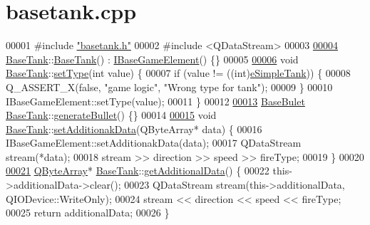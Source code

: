 \hypertarget{a00038_source}{}\section{basetank.\+cpp}
\label{a00038_source}

\begin{DoxyCode}
00001 \textcolor{preprocessor}{#}\textcolor{preprocessor}{include} \hyperlink{a00041}{"basetank.h"}
00002 \textcolor{preprocessor}{#}\textcolor{preprocessor}{include} \textcolor{preprocessor}{<}\textcolor{preprocessor}{QDataStream}\textcolor{preprocessor}{>}
00003 
\hyperlink{a00157_ab09f29abaec12417480cae3a5f900a41}{00004} \hyperlink{a00157}{BaseTank}::\hyperlink{a00157_ab09f29abaec12417480cae3a5f900a41}{BaseTank}() : \hyperlink{a00137_ae2be75da1a2a9edfabe993770e24654a}{IBaseGameElement}() \{\}
00005 
\hyperlink{a00157_a455ad8853248e1976e9d817eb55f102a}{00006} \textcolor{keywordtype}{void} \hyperlink{a00157}{BaseTank}::\hyperlink{a00157_a455ad8853248e1976e9d817eb55f102a}{setType}(\textcolor{keywordtype}{int} value) \{
00007   \textcolor{keywordflow}{if} (value != ((\textcolor{keywordtype}{int})\hyperlink{a00047_a5afb9d86324dabec6a0c73f9b6aa1bafa8be91a43861bfbfc5c5c0a2ba4898e30}{eSimpleTank})) \{
00008     Q\_ASSERT\_X(\textcolor{keyword}{false}, \textcolor{stringliteral}{"game logic"}, \textcolor{stringliteral}{"Wrong type for tank"});
00009   \}
00010   IBaseGameElement::setType(value);
00011 \}
00012 
\hyperlink{a00157_a901c01a2908f900b4cd45e791d27b0d3}{00013} \hyperlink{a00153}{BaseBulet} \hyperlink{a00157}{BaseTank}::\hyperlink{a00157_a901c01a2908f900b4cd45e791d27b0d3}{generateBullet}() \{\}
00014 
\hyperlink{a00157_a7e61943b1d601b7ff3206857f5198e66}{00015} \textcolor{keywordtype}{void} \hyperlink{a00157}{BaseTank}::\hyperlink{a00157_a7e61943b1d601b7ff3206857f5198e66}{setAdditionakData}(QByteArray* data) \{
00016   IBaseGameElement::setAdditionakData(data);
00017   QDataStream stream(*data);
00018   stream >> direction >> speed >> fireType;
00019 \}
00020 
\hyperlink{a00157_aeecdd72e10d3996ee6c72c59f8bf69d8}{00021} \hyperlink{a00157_aeecdd72e10d3996ee6c72c59f8bf69d8}{QByteArray}* \hyperlink{a00157}{BaseTank}::\hyperlink{a00157_aeecdd72e10d3996ee6c72c59f8bf69d8}{getAdditionalData}() \{
00022   \textcolor{keyword}{this}->additionalData->clear();
00023   QDataStream stream(\textcolor{keyword}{this}->additionalData, QIODevice::WriteOnly);
00024   stream << direction << speed << fireType;
00025   \textcolor{keywordflow}{return} additionalData;
00026 \}
\end{DoxyCode}
